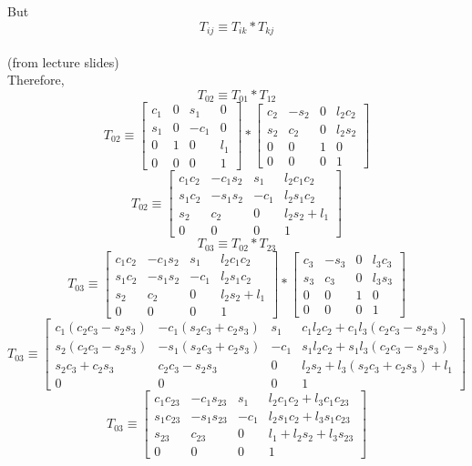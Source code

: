 \documentclass[12pt]{article}
\newcommand{\fromlectures}{{\\ \color{blue} \hspace*{\fill}(from lecture slides)} \\}
\begin{document}
But
\[
  T_{ij} \equiv T_{ik} * T_{kj}
\]
\fromlectures
Therefore,
\[
  T_{02} \equiv T_{01} * T_{12}
\]
\[
  T_{02} \equiv
  \begin{bmatrix}
    c_1 & 0 & s_1 & 0 \\
    s_1 & 0 & -c_1 & 0 \\
    0 & 1 & 0 & l_1 \\
    0 & 0 & 0 & 1
  \end{bmatrix}
  *
  \begin{bmatrix}
    c_2 & -s_2 & 0 & l_2c_2 \\
    s_2 & c_2 & 0 & l_2s_2 \\
    0 & 0 & 1 & 0 \\
    0 & 0 & 0 & 1
  \end{bmatrix}
\]
\[
  T_{02} \equiv
  \begin{bmatrix}
    c_1c_2 & -c_1s_2 & s_1 & l_2c_1c_2 \\
    s_1c_2 & -s_1s_2 & -c_1 & l_2s_1c_2 \\
    s_2 & c_2 & 0 & l_2s_2 + l_1 \\
    0 & 0 & 0 & 1
  \end{bmatrix}
\]
\[
  T_{03} \equiv T_{02} * T_{23}
\]
\[
  T_{03} \equiv
  \begin{bmatrix}
    c_1c_2 & -c_1s_2 & s_1 & l_2c_1c_2 \\
    s_1c_2 & -s_1s_2 & -c_1 & l_2s_1c_2 \\
    s_2 & c_2 & 0 & l_2s_2 + l_1 \\
    0 & 0 & 0 & 1
  \end{bmatrix}
  *
  \begin{bmatrix}
    c_3 & -s_3 & 0 & l_3c_3 \\
    s_3 & c_3 & 0 & l_3s_3 \\
    0 & 0 & 1 & 0 \\
    0 & 0 & 0 & 1
  \end{bmatrix}
\]
\[
  T_{03} \equiv
  \begin{bmatrix}
    c_1(c_2c_3 - s_2s_3) & -c_1(s_2c_3 + c_2s_3) & s_1  & c_1l_2c_2 + c_1l_3(c_2c_3 - s_2s_3) \\
    s_2(c_2c_3 - s_2s_3) & -s_1(s_2c_3 + c_2s_3) & -c_1 & s_1l_2c_2 + s_1l_3(c_2c_3 - s_2s_3) \\
    s_2c_3 + c_2s_3      & c_2c_3 - s_2s_3       & 0    & l_2s_2 + l_3(s_2c_3 + c_2s_3) + l_1 \\
    0 & 0 & 0 & 1
  \end{bmatrix}
\]
\[
  T_{03} \equiv
  \begin{bmatrix}
    c_1c_{23} & -c_1s_{23} & s_1  & l_2c_1c_2 + l_3c_1c_{23} \\
    s_1c_{23} & -s_1s_{23} & -c_1 & l_2s_1c_2 + l_3s_1c_{23} \\
    s_{23}    & c_{23}     & 0    & l_1 + l_2s_2 + l_3s_{23} \\
    0 & 0 & 0 & 1
  \end{bmatrix}
\]
\end{document}
